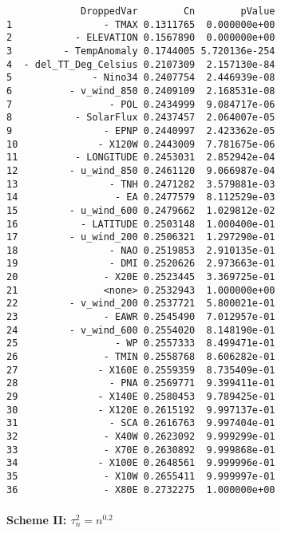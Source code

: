 \documentclass[fleqn,11pt]{article}
\begin{document}
\singlespacing
\begin{footnotesize}
\begin{verbatim}
             DroppedVar        Cn        pValue
1                - TMAX 0.1311765  0.000000e+00
2           - ELEVATION 0.1567890  0.000000e+00
3         - TempAnomaly 0.1744005 5.720136e-254
4  - del_TT_Deg_Celsius 0.2107309  2.157130e-84
5              - Nino34 0.2407754  2.446939e-08
6          - v_wind_850 0.2409109  2.168531e-08
7                 - POL 0.2434999  9.084717e-06
8           - SolarFlux 0.2437457  2.064007e-05
9                - EPNP 0.2440997  2.423362e-05
10              - X120W 0.2443009  7.781675e-06
11          - LONGITUDE 0.2453031  2.852942e-04
12         - u_wind_850 0.2461120  9.066987e-04
13                - TNH 0.2471282  3.579881e-03
14                 - EA 0.2477579  8.112529e-03
15         - u_wind_600 0.2479662  1.029812e-02
16           - LATITUDE 0.2503148  1.000400e-01
17         - u_wind_200 0.2506321  1.297290e-01
18                - NAO 0.2519853  2.910135e-01
19                - DMI 0.2520626  2.973663e-01
20               - X20E 0.2523445  3.369725e-01
21               <none> 0.2532943  1.000000e+00
22         - v_wind_200 0.2537721  5.800021e-01
23               - EAWR 0.2545490  7.012957e-01
24         - v_wind_600 0.2554020  8.148190e-01
25                 - WP 0.2557333  8.499471e-01
26               - TMIN 0.2558768  8.606282e-01
27              - X160E 0.2559359  8.735409e-01
28                - PNA 0.2569771  9.399411e-01
29              - X140E 0.2580453  9.789425e-01
30              - X120E 0.2615192  9.997137e-01
31                - SCA 0.2616763  9.997404e-01
32               - X40W 0.2623092  9.999299e-01
33               - X70E 0.2630892  9.999868e-01
34              - X100E 0.2648561  9.999996e-01
35               - X10W 0.2655411  9.999997e-01
36               - X80E 0.2732275  1.000000e+00
\end{verbatim}
\end{footnotesize}

\doublespacing
\paragraph{Scheme II: $\tau_n^2 = n^{0.2}$}
\end{document}
